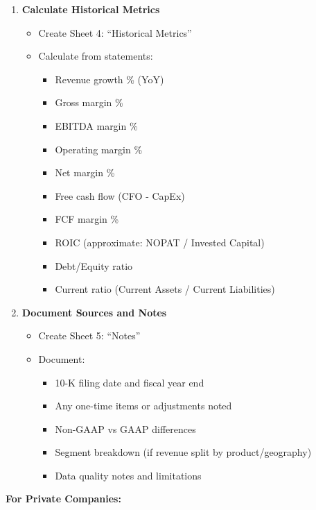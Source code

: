 \documentclass[11pt]{article}
\begin{document}
\begin{enumerate}[leftmargin=*,itemsep=2pt,topsep=2pt]
\begin{itemize}[leftmargin=*,itemsep=2pt,topsep=2pt]
\begin{itemize}[leftmargin=*,itemsep=2pt,topsep=2pt]
\item {} Total liabilities + equity
\end{itemize}
\end{itemize}
\item {} \textbf{Calculate Historical Metrics}
\begin{itemize}[leftmargin=*,itemsep=2pt,topsep=2pt]
\item {} Create Sheet 4: ``Historical Metrics''
\item {} Calculate from statements:
\begin{itemize}[leftmargin=*,itemsep=2pt,topsep=2pt]
\item {} Revenue growth \% (YoY)
\item {} Gross margin \%
\item {} EBITDA margin \%
\item {} Operating margin \%
\item {} Net margin \%
\item {} Free cash flow (CFO - CapEx)
\item {} FCF margin \%
\item {} ROIC (approximate: NOPAT / Invested Capital)
\item {} Debt/Equity ratio
\item {} Current ratio (Current Assets / Current Liabilities)
\end{itemize}
\end{itemize}
\item {} \textbf{Document Sources and Notes}
\begin{itemize}[leftmargin=*,itemsep=2pt,topsep=2pt]
\item {} Create Sheet 5: ``Notes''
\item {} Document:
\begin{itemize}[leftmargin=*,itemsep=2pt,topsep=2pt]
\item {} 10-K filing date and fiscal year end
\item {} Any one-time items or adjustments noted
\item {} Non-GAAP vs GAAP differences
\item {} Segment breakdown (if revenue split by product/geography)
\item {} Data quality notes and limitations
\end{itemize}
\end{itemize}
\end{enumerate}

\textbf{For Private Companies:}
\end{document}
